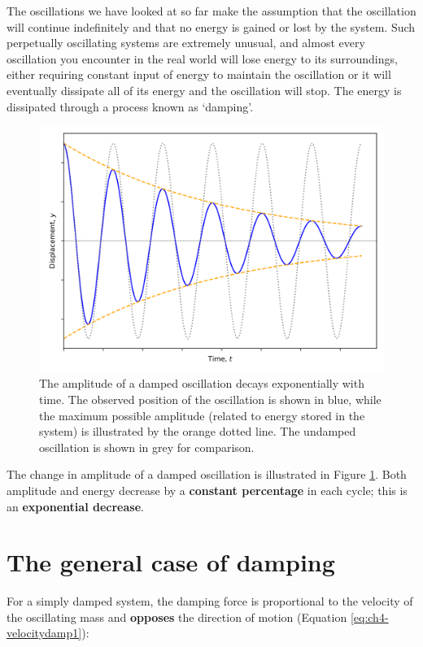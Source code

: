 \documentclass[
]{book}
\begin{document}
The oscillations we have looked at so far make the assumption that the oscillation will continue indefinitely and that no energy is gained or lost by the system. Such perpetually oscillating systems are extremely unusual, and almost every oscillation you encounter in the real world will lose energy to its surroundings, either requiring constant input of energy to maintain the oscillation or it will eventually dissipate all of its energy and the oscillation will stop. The energy is dissipated through a process known as `damping'.

\begin{figure}

{\centering \includegraphics[width=0.7\linewidth]{visualisations/ch4-dampedoscill1} 

}

\caption{The amplitude of a damped oscillation decays exponentially with time.  The observed position of the oscillation is shown in blue, while the maximum possible amplitude (related to energy stored in the system) is illustrated by the orange dotted line.  The undamped oscillation is shown in grey for comparison.}\label{fig:ch4-dampedoscillation1}
\end{figure}

The change in amplitude of a damped oscillation is illustrated in Figure \ref{fig:ch4-dampedoscillation1}. Both amplitude and energy decrease by a \textbf{constant percentage} in each cycle; this is an \textbf{exponential decrease}.

\hypertarget{sec:ch4-generalcasedamping}{%
\section{The general case of damping}\label{sec:ch4-generalcasedamping}}

For a simply damped system, the damping force is proportional to the velocity of the oscillating mass and \textbf{opposes} the direction of motion (Equation \eqref{eq:ch4-velocitydamp1}):
\end{document}
